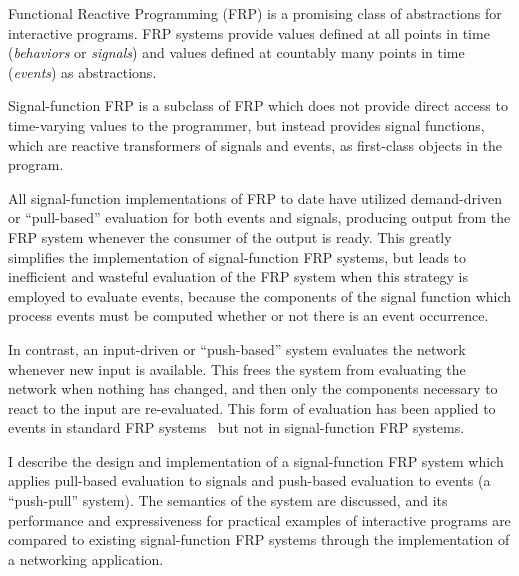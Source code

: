 Functional Reactive Programming (FRP) is a promising class of abstractions for
interactive programs. FRP systems provide values defined at all points in time
({\em behaviors} or {\em signals}) and values defined at countably many points
in time ({\em events}) as abstractions.

Signal-function FRP is a subclass of FRP which does not provide direct access to
time-varying values to the programmer, but instead provides signal functions,
which are reactive transformers of signals and events, as first-class objects in
the program. 

All signal-function implementations of FRP to date have utilized demand-driven
or ``pull-based''  evaluation for both events and signals, producing output from
the FRP system whenever the consumer of the output is ready. This greatly
simplifies the implementation of signal-function FRP systems, but leads to
inefficient and wasteful evaluation of the FRP system when this strategy is
employed to evaluate events, because the components of the signal function which
process events must be computed whether or not there is an event occurrence.

In contrast, an input-driven or ``push-based'' system evaluates the network
whenever new input is available. This frees the system from evaluating the
network when nothing has changed, and then only the components necessary to
react to the input are re-evaluated. This form of evaluation has been applied to
events in standard FRP systems~\cite{Elliott2009} but not in signal-function FRP
systems.

I describe the design and implementation of a signal-function FRP system which
applies pull-based evaluation to signals and push-based evaluation to events (a
``push-pull'' system). The semantics of the system are discussed, and its
performance and expressiveness for practical examples of interactive programs
are compared to existing signal-function FRP systems through the implementation
of a networking application.
